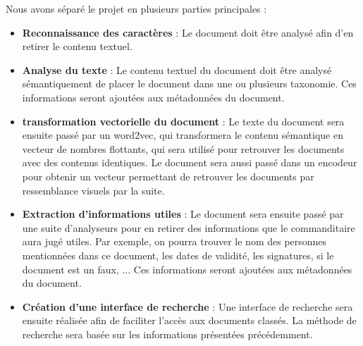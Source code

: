 Nous avons séparé le projet en plusieurs parties principales :
\begin {itemize}
\item \textbf {Reconnaissance des caractères} :
Le document doit être analysé afin d'en retirer le contenu textuel.
\\
\item \textbf {Analyse du texte} :
Le contenu textuel du document doit être analysé sémantiquement de placer le document dans une ou plusieurs taxonomie. 
Ces informations seront ajoutées aux métadonnées du document.
\\
\item \textbf {transformation vectorielle du document} :
Le texte du document sera ensuite passé par un word2vec, qui transformera le contenu sémantique en vecteur de nombres flottants, qui sera utilisé pour retrouver les documents avec des contenus identiques.
Le document sera aussi passé dans un encodeur pour obtenir un vecteur permettant de retrouver les documents par ressemblance visuels par la suite.
\\
\item \textbf {Extraction d'informations utiles} :
Le document sera ensuite passé par une suite d'analyseurs pour en retirer des informations que le commanditaire aura jugé utiles.
Par exemple, on pourra trouver le nom des personnes mentionnées dans ce document, les dates de validité, les signatures, si le document est un faux, ... 
Ces informations seront ajoutées aux métadonnées du document.
\\
\item \textbf{Création d'une interface de recherche} :
Une interface de recherche sera ensuite réalisée afin de faciliter l'accès aux documents classés.
La méthode de recherche sera basée sur les informations présentées précédemment.
\\
\end {itemize}




